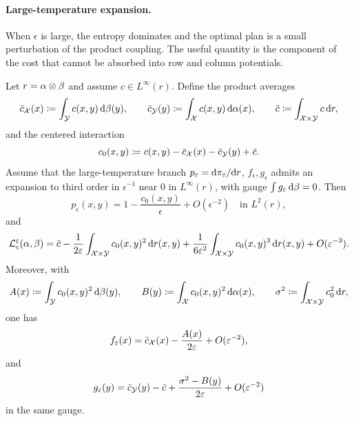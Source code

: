 \paragraph{Large-temperature expansion.}

When $\epsilon$ is large, the entropy dominates and the optimal plan is a small perturbation of the product coupling. The useful quantity is the component of the cost that cannot be absorbed into row and column potentials.

\begin{prop}\label{prop-large-epsilon-expansion}
	Let $r=\alpha\otimes\beta$ and assume $c\in L^\infty(r)$. Define the product averages
	\[
		\bar c_{\mathcal{X}}(x)\coloneqq\int_{\mathcal{Y}} c(x,y)\,\mathrm{d}\beta(y),\qquad
		\bar c_{\mathcal{Y}}(y)\coloneqq\int_{\mathcal{X}} c(x,y)\,\mathrm{d}\alpha(x),\qquad
		\bar c\coloneqq\int_{\mathcal{X}\times\mathcal{Y}}c\,\mathrm{d} r,
	\]
	and the centered interaction
	\[
		c_0(x,y)\coloneqq c(x,y)-\bar c_{\mathcal{X}}(x)-\bar c_{\mathcal{Y}}(y)+\bar c.
	\]
	Assume that the large-temperature branch $p_\varepsilon=\mathrm{d}\pi_\varepsilon/\mathrm{d} r$, $f_\epsilon,g_\epsilon$ admits an expansion to third order in $\epsilon^{-1}$ near $0$ in $L^\infty(r)$, with gauge $\int g_\varepsilon\,\mathrm{d}\beta=0$. Then
	\[
		p_\epsilon(x,y)=1-\frac{c_0(x,y)}{\epsilon}+O(\epsilon^{-2})
		\quad\text{in }L^2(r),
	\]
	and
	\[
		\mathcal{L}_c^\varepsilon(\alpha,\beta)
		=
		\bar c-\frac{1}{2\varepsilon}\int_{\mathcal{X}\times\mathcal{Y}} c_0(x,y)^2\,\mathrm{d} r(x,y)
		+\frac{1}{6\varepsilon^2}\int_{\mathcal{X}\times\mathcal{Y}} c_0(x,y)^3\,\mathrm{d} r(x,y)
		+O(\varepsilon^{-3}).
	\]
	Moreover, with
	\[
		A(x)\coloneqq\int_{\mathcal{Y}} c_0(x,y)^2\,\mathrm{d}\beta(y),\qquad
		B(y)\coloneqq\int_{\mathcal{X}} c_0(x,y)^2\,\mathrm{d}\alpha(x),\qquad
		\sigma^2\coloneqq\int_{\mathcal{X}\times\mathcal{Y}}c_0^2\,\mathrm{d} r,
	\]
	one has
	\[
		f_\varepsilon(x)=\bar c_{\mathcal{X}}(x)-\frac{A(x)}{2\varepsilon}+O(\varepsilon^{-2}),
	\]
	and
	\[
		g_\varepsilon(y)=\bar c_{\mathcal{Y}}(y)-\bar c
		+\frac{\sigma^2-B(y)}{2\varepsilon}+O(\varepsilon^{-2})
	\]
	in the same gauge.
\end{prop}

